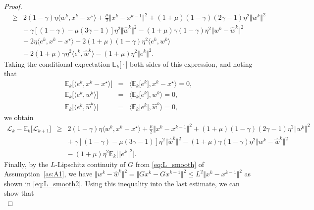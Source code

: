 \documentclass{article}
\newcommand{\norms}[1]{\Vert#1\Vert}
\newcommand{\iprods}[1]{\langle #1\rangle}
\newcommand{\Expsk}[2]{\mathbb{E}_{#1}\big[#2\big]}
\newcommand{\Lc}{\mathcal{L}}
\theoremstyle{plain}
\theoremstyle{definition}
\theoremstyle{remark}
\begin{document}
\begin{proof}
\begin{equation*}
\begin{array}{lcl}
& \geq & 2(1-\gamma)\eta \iprods{w^k, x^k - x^{\star}}  +  \frac{\mu}{2}\norms{x^k - x^{k-1}}^2 + (1+\mu)(1-\gamma)(2\gamma - 1)\eta^2 \norms{w^k}^2 \\
&& + {~}  \gamma[ (1-\gamma) - \mu(3\gamma-1)]\eta^2\norms{\hat{w}^k}^2 -  (1+\mu)\gamma(1-\gamma)\eta^2\norms{w^k - \hat{w}^k}^2 \\
&& +  {~}  2\eta\iprods{e^k, x^k - x^{\star}}  - 2(1+\mu)(1-\gamma)\eta^2 \iprods{e^k, w^k} \\
&& + {~} 2(1+\mu)\gamma\eta^2\iprods{e^k, \hat{w}^k} - (1+\mu)\eta^2\norms{e^k}^2.
\end{array} 
\end{equation*}
Taking the conditional expectation $\Expsk{k}{\cdot}$ both sides of this expression, and noting that
\begin{equation*}
\begin{array}{lcl}
\Expsk{k}{ \iprods{e^k, x^k - x^{\star}} } & = & \iprods{\Expsk{k}{e^k}, x^k - x^{\star}} = 0, \\
\Expsk{k}{ \iprods{e^k, w^k} } & = & \iprods{\Expsk{k}{e^k}, w^k} = 0, \\
\Expsk{k}{ \iprods{e^k, \hat{w}^k} } & = & \iprods{\Expsk{k}{e^k}, \hat{w}^k} = 0,
\end{array}
\end{equation*}
we obtain
\begin{equation*} 
\begin{array}{lcl}
\Lc_k - \Expsk{k}{ \Lc_{k+1} }
& \geq & 2(1-\gamma)\eta \iprods{w^k, x^k - x^{\star}}  +  \frac{\mu}{2}\norms{x^k - x^{k-1}}^2 + (1+\mu)(1-\gamma)(2\gamma - 1)\eta^2 \norms{w^k}^2 \\
&& + {~}  \gamma[ (1-\gamma) - \mu(3\gamma-1)]\eta^2\norms{\hat{w}^k}^2 -  (1+\mu)\gamma(1-\gamma)\eta^2\norms{w^k - \hat{w}^k}^2 \\
&& - {~} (1+\mu)\eta^2 \Expsk{k}{ \norms{e^k}^2 }.
\end{array} 
\end{equation*}
Finally, by the $L$-Lipschitz continuity of $G$ from \eqref{eq:L_smooth} of Assumption~\ref{as:A1}, we have $\norms{w^k - \hat{w}^k}^2 = \norms{Gx^k - Gx^{k-1}}^2 \leq L^2\norms{x^k - x^{k-1}}^2$ as shown in \eqref{eq:L_smooth2}.
Using this inequality into the last estimate, we can show that
\begin{equation*} 

\end{equation*}
\end{proof}
\end{document}
